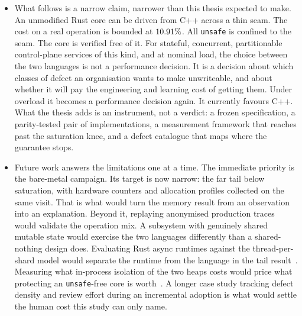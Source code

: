 \documentclass[english,twoside,openright,a4paper,censored,csm,software-track-2020]{HYthesisML}
\begin{document}
\begin{itemize}
        choice costs.
  \item What follows is a narrow claim, narrower than this thesis expected to make. An unmodified
        Rust core can be driven from C++ across a thin seam. The cost on a real operation is
        bounded at $10.91\%$. All \texttt{unsafe} is confined to the seam. The core is
        verified free of it. For stateful, concurrent, partitionable control-plane services of
        this kind, and at nominal load, the choice between the two languages is not a performance
        decision. It is a decision about which classes of defect an organisation wants to make
        unwriteable, and about whether it will pay the engineering and learning cost of getting
        them. Under overload it becomes a performance decision again. It currently favours C++.
        What the thesis adds is an instrument, not a verdict: a frozen specification, a
        parity-tested pair of implementations, a measurement framework that reaches past the
        saturation knee, and a defect catalogue that maps where the guarantee stops.
  \item Future work answers the limitations one at a time. The immediate priority is the
        bare-metal campaign. Its target is now narrow: the far tail below saturation, with
        hardware counters and allocation profiles collected on the same visit. That is what would
        turn the memory result from an observation into an explanation. Beyond it, replaying
        anonymised production traces would validate the operation mix. A subsystem with
        genuinely shared mutable state would exercise the two languages differently than a
        shared-nothing design does. Evaluating Rust async runtimes against the thread-per-shard
        model would separate the runtime from the language in the tail
        result~\cite{arvidsson2025async}. Measuring what in-process isolation of the two heaps
        costs would price what protecting an \texttt{unsafe}-free core is
        worth~\cite{rivera2021galeed}. A longer case study tracking defect density and review
        effort during an incremental adoption is what would settle the human cost this study can
        only name.
\end{itemize}




\cleardoublepage %

\printbibliography
\end{document}

